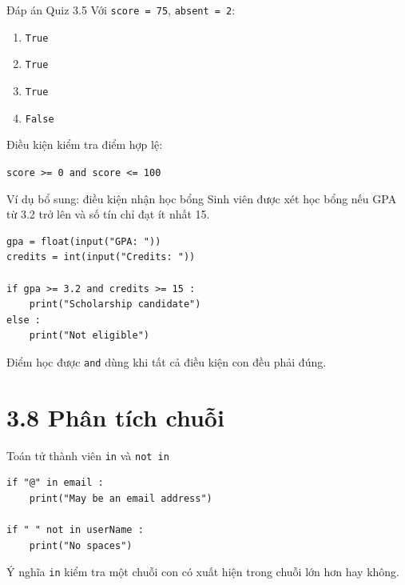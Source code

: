 \documentclass[aspectratio=169,11pt]{beamer}
\newcommand{\code}[1]{\texttt{#1}}
\begin{document}
\begin{frame}{Đáp án Quiz 3.5}
Với \code{score = 75}, \code{absent = 2}:
\begin{enumerate}
  \item \code{True}
  \item \code{True}
  \item \code{True}
  \item \code{False}
\end{enumerate}
Điều kiện kiểm tra điểm hợp lệ:
\begin{center}
\code{score >= 0 and score <= 100}
\end{center}
\end{frame}

\begin{frame}[fragile]{Ví dụ bổ sung: điều kiện nhận học bổng}
Sinh viên được xét học bổng nếu GPA từ 3.2 trở lên và số tín chỉ đạt ít nhất 15.
\begin{lstlisting}[style=py]
gpa = float(input("GPA: "))
credits = int(input("Credits: "))

if gpa >= 3.2 and credits >= 15 :
    print("Scholarship candidate")
else :
    print("Not eligible")
\end{lstlisting}
\begin{block}{Điểm học được}
\code{and} dùng khi tất cả điều kiện con đều phải đúng.
\end{block}
\end{frame}

\section{3.8 Phân tích chuỗi}

\begin{frame}[fragile]{Toán tử thành viên \texttt{in} và \texttt{not in}}
\begin{lstlisting}[style=py]
if "@" in email :
    print("May be an email address")

if " " not in userName :
    print("No spaces")
\end{lstlisting}
\begin{block}{Ý nghĩa}
\code{in} kiểm tra một chuỗi con có xuất hiện trong chuỗi lớn hơn hay không.
\end{block}
\end{frame}
\end{document}
